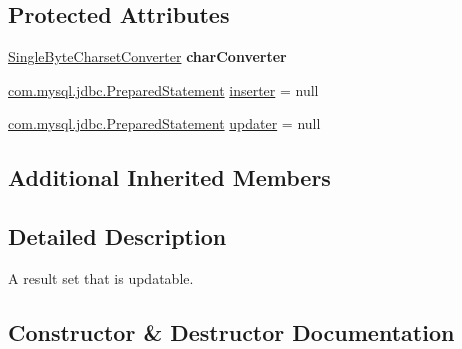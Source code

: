 \subsection*{Protected Attributes}
\begin{DoxyCompactItemize}
\item 
\mbox{\label{classcom_1_1mysql_1_1jdbc_1_1_updatable_result_set_a01af0332de3122e40fe57bf2845438a0}} 
\mbox{\hyperlink{classcom_1_1mysql_1_1jdbc_1_1_single_byte_charset_converter}{Single\+Byte\+Charset\+Converter}} {\bfseries char\+Converter}
\item 
\mbox{\hyperlink{classcom_1_1mysql_1_1jdbc_1_1_prepared_statement}{com.\+mysql.\+jdbc.\+Prepared\+Statement}} \mbox{\hyperlink{classcom_1_1mysql_1_1jdbc_1_1_updatable_result_set_a364f682dfe9945353fce651536140e46}{inserter}} = null
\item 
\mbox{\hyperlink{classcom_1_1mysql_1_1jdbc_1_1_prepared_statement}{com.\+mysql.\+jdbc.\+Prepared\+Statement}} \mbox{\hyperlink{classcom_1_1mysql_1_1jdbc_1_1_updatable_result_set_a865417da0d947e92e7859fb28301f93a}{updater}} = null
\end{DoxyCompactItemize}
\subsection*{Additional Inherited Members}


\subsection{Detailed Description}
A result set that is updatable. 

\subsection{Constructor \& Destructor Documentation}
\mbox{\label{classcom_1_1mysql_1_1jdbc_1_1_updatable_result_set_a6d5d18456bae52651db9e6040ed3955a}} 
